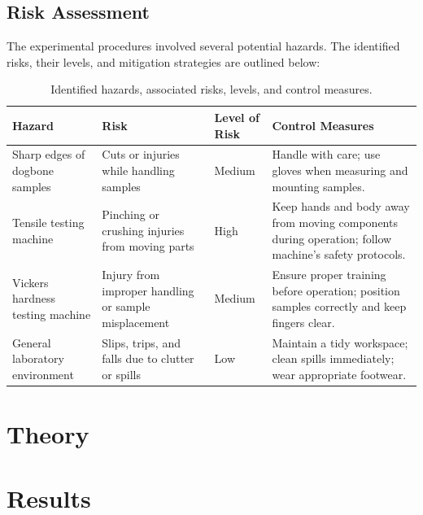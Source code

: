 \documentclass{article}
\begin{document}
\subsection{Risk Assessment}
The experimental procedures involved several potential hazards. The identified risks, their levels, and mitigation strategies are outlined below:
\begin{table}[h!]
    \centering
    \begin{tabular}{|p{4cm}|p{4cm}|p{3cm}|p{4cm}|}
        \hline
        \textbf{Hazard} & \textbf{Risk} & \textbf{Level of Risk} & \textbf{Control Measures} \\
        \hline
        Sharp edges of dogbone samples & Cuts or injuries while handling samples & Medium & Handle with care; use gloves when measuring and mounting samples. \\
        \hline
        Tensile testing machine & Pinching or crushing injuries from moving parts & High & Keep hands and body away from moving components during operation; follow machine's safety protocols. \\
        \hline
        Vickers hardness testing machine & Injury from improper handling or sample misplacement & Medium & Ensure proper training before operation; position samples correctly and keep fingers clear. \\
        \hline
        General laboratory environment & Slips, trips, and falls due to clutter or spills & Low & Maintain a tidy workspace; clean spills immediately; wear appropriate footwear. \\ 
        \hline
    \end{tabular}
    \caption{Identified hazards, associated risks, levels, and control measures.}
    \label{tab:risk-assessment}
\end{table}

 


    \newpage\vspace*{-5pt}
    \section{Theory}

    \newpage\vspace*{-5pt}
    \section{Results}
    
\end{document}
